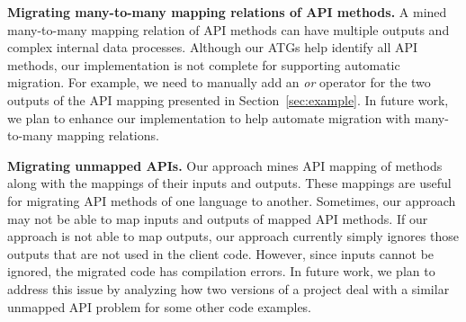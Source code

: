
\textbf{Migrating many-to-many mapping relations of API methods.}
A mined many-to-many mapping relation of API methods can have multiple outputs
and complex internal data processes. Although our ATGs
help identify all API methods, our implementation is not complete
for supporting automatic migration. For example, we need to manually add an
\emph{or} operator for the two outputs of the API mapping presented
in Section~\ref{sec:example}. In future work, we plan to enhance our implementation to help
automate migration with many-to-many mapping relations.

\textbf{Migrating unmapped APIs.} Our approach mines API mapping of
methods along with the mappings of their inputs and outputs. These
mappings are useful for migrating API methods of one language to
another. Sometimes, our approach may not be able to map inputs and
outputs of mapped API methods. If our approach is not able to map
outputs, our approach currently simply ignores those outputs that are not used
in the client code. However, since inputs cannot be ignored, the
migrated code has compilation errors. In future work, we
plan to address this issue by analyzing how two versions of a
project deal with a similar unmapped API problem for some other code
examples. 